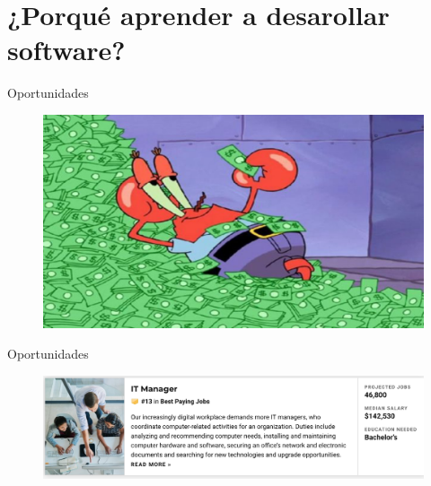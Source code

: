 \documentclass[aspectratio=169]{beamer}
\begin{document}
{
	\section{¿Porqué aprender a desarollar software?}
}





\begin{frame}{Oportunidades}

            \begin{figure}
                \centering
                \includegraphics[width=\linewidth]{Images/cangrejo}
            \end{figure}
\end{frame}

\begin{frame}{Oportunidades}

            \begin{figure}
                \centering
                \includegraphics[width=\linewidth]{Images/trabajo}
            \end{figure}
\end{frame}
\end{document}
